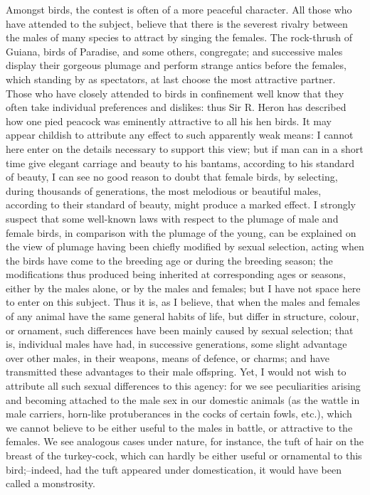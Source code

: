 Amongst birds, the contest is often of a more peaceful character. All those who have attended to the subject, believe that there is the severest rivalry between the males of many species to attract by singing the females. The rock-thrush of Guiana, birds of Paradise, and some others, congregate; and successive males display their gorgeous plumage and perform strange antics before the females, which standing by as spectators, at last choose the most attractive partner. Those who have closely attended to birds in confinement well know that they often take individual preferences and dislikes: thus Sir R. Heron has described how one pied peacock was eminently attractive to all his hen birds. It may appear childish to attribute any effect to such apparently weak means: I cannot here enter on the details necessary to support this view; but if man can in a short time give elegant carriage and beauty to his bantams, according to his standard of beauty, I can see no good reason to doubt that female birds, by selecting, during thousands of generations, the most melodious or beautiful males, according to their standard of beauty, might produce a marked effect. I strongly suspect that some well-known laws with respect to the plumage of male and female birds, in comparison with the plumage of the young, can be explained on the view of plumage having been chiefly modified by sexual selection, acting when the birds have come to the breeding age or during the breeding season; the modifications thus produced being inherited at corresponding ages or seasons, either by the males alone, or by the males and females; but I have not space here to enter on this subject.
Thus it is, as I believe, that when the males and females of any animal have the same general habits of life, but differ in structure, colour, or ornament, such differences have been mainly caused by sexual selection; that is, individual males have had, in successive generations, some slight advantage over other males, in their weapons, means of defence, or charms; and have transmitted these advantages to their male offspring. Yet, I would not wish to attribute all such sexual differences to this agency: for we see peculiarities arising and becoming attached to the male sex in our domestic animals (as the wattle in male carriers, horn-like protuberances in the cocks of certain fowls, etc.), which we cannot believe to be either useful to the males in battle, or attractive to the females. We see analogous cases under nature, for instance, the tuft of hair on the breast of the turkey-cock, which can hardly be either useful or ornamental to this bird;--indeed, had the tuft appeared under domestication, it would have been called a monstrosity.

